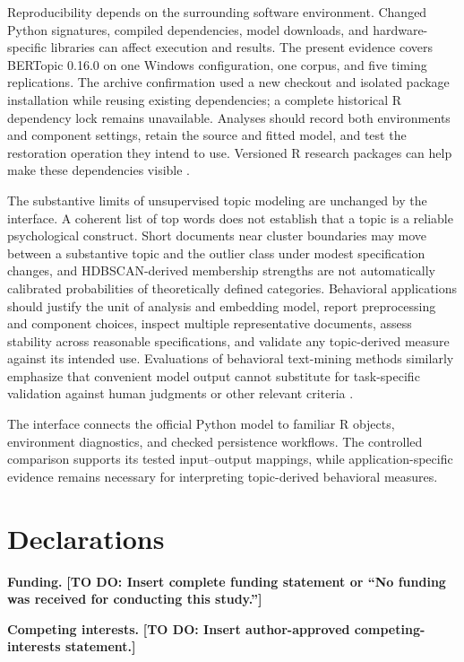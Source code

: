 \documentclass[12pt]{article}
\newcommand{\todo}[1]{\textbf{[TO DO: #1]}}
\begin{document}
Reproducibility depends on the surrounding software environment. Changed Python signatures, compiled dependencies, model downloads, and hardware-specific libraries can affect execution and results. The present evidence covers BERTopic 0.16.0 on one Windows configuration, one corpus, and five timing replications. The archive confirmation used a new checkout and isolated package installation while reusing existing dependencies; a complete historical R dependency lock remains unavailable. Analyses should record both environments and component settings, retain the source and fitted model, and test the restoration operation they intend to use. Versioned R research packages can help make these dependencies visible \citep{vuorre2021sharing}.

The substantive limits of unsupervised topic modeling are unchanged by the interface. A coherent list of top words does not establish that a topic is a reliable psychological construct. Short documents near cluster boundaries may move between a substantive topic and the outlier class under modest specification changes, and HDBSCAN-derived membership strengths are not automatically calibrated probabilities of theoretically defined categories. Behavioral applications should justify the unit of analysis and embedding model, report preprocessing and component choices, inspect multiple representative documents, assess stability across reasonable specifications, and validate any topic-derived measure against its intended use. Evaluations of behavioral text-mining methods similarly emphasize that convenient model output cannot substitute for task-specific validation against human judgments or other relevant criteria \citep{macanovic2024systematic}.

The interface connects the official Python model to familiar R objects, environment diagnostics, and checked persistence workflows. The controlled comparison supports its tested input--output mappings, while application-specific evidence remains necessary for interpreting topic-derived behavioral measures.

\section*{Declarations}

\textbf{Funding.} \todo{Insert complete funding statement or ``No funding was received for conducting this study.''}

\textbf{Competing interests.} \todo{Insert author-approved competing-interests statement.}
\end{document}
